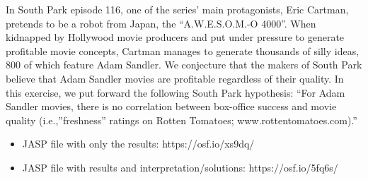 \documentclass[
  letterpaper,
  DIV=11,
  numbers=noendperiod]{scrreprt}
\providecommand{\tightlist}{%
  \setlength{\itemsep}{0pt}\setlength{\parskip}{0pt}}\usepackage{longtable,booktabs,array}
\begin{document}
In South Park episode 116, one of the series' main protagonists, Eric
Cartman, pretends to be a robot from Japan, the ``A.W.E.S.O.M.-O 4000''.
When kidnapped by Hollywood movie producers and put under pressure to
generate profitable movie concepts, Cartman manages to generate
thousands of silly ideas, 800 of which feature Adam Sandler. We
conjecture that the makers of South Park believe that Adam Sandler
movies are profitable regardless of their quality. In this exercise, we
put forward the following South Park hypothesis: ``For Adam Sandler
movies, there is no correlation between box-office success and movie
quality (i.e.,''freshness'' ratings on Rotten Tomatoes;
www.rottentomatoes.com).''

\begin{itemize}
\tightlist
\item
  JASP file with only the results: https://osf.io/xs9dq/
\item
  JASP file with results and interpretation/solutions:
  https://osf.io/5fq6s/
\end{itemize}
\end{document}
